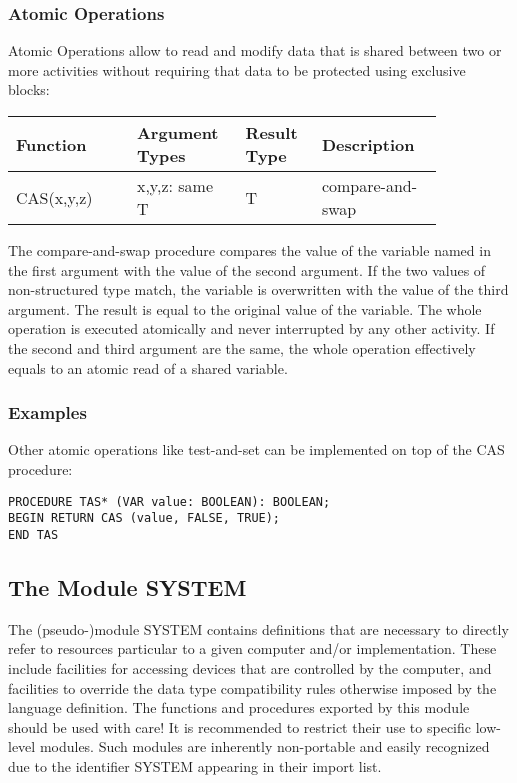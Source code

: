 \documentclass[a4wide,11pt]{article}
\begin{document}
\subsubsection{Atomic Operations}

Atomic Operations allow to read and modify data that is shared between two or more activities without requiring that data to be protected using exclusive blocks:

\begin{longtable}{|p{0.25\linewidth}|p{0.2\linewidth}|p{0.15\linewidth}|p{0.25\linewidth}|}
\hline
Function & Argument Types & Result Type & Description \\
\hline\hline
\endhead
CAS(x,y,z) & x,y,z: same T & T & compare-and-swap \\
\hline
\end{longtable}

The compare-and-swap procedure compares the value of the variable named in the first argument with the value of the second argument.
If the two values of non-structured type match, the variable is overwritten with the value of the third argument.
The result is equal to the original value of the variable.
The whole operation is executed atomically and never interrupted by any other activity.
If the second and third argument are the same, the whole operation effectively equals to an atomic read of a shared variable.

\begin{annotation}
\subsubsection{Examples}
Other atomic operations like test-and-set can be implemented on top of the CAS procedure:
\begin{lstlisting}[style=example]
PROCEDURE TAS* (VAR value: BOOLEAN): BOOLEAN;
BEGIN RETURN CAS (value, FALSE, TRUE);
END TAS
\end{lstlisting}

\end{annotation}

\subsection{The Module SYSTEM}
The (pseudo-)module SYSTEM contains definitions that are necessary to directly refer to resources particular to a given computer and/or implementation.
These include facilities for accessing devices that are controlled by the computer, and facilities to override the data type compatibility rules otherwise imposed by the language definition.
The functions and procedures exported by this module should be used with care! It is recommended to restrict their use to specific low-level modules.
Such modules are inherently non-portable and easily recognized due to the identifier SYSTEM appearing in their import list.
\end{document}
